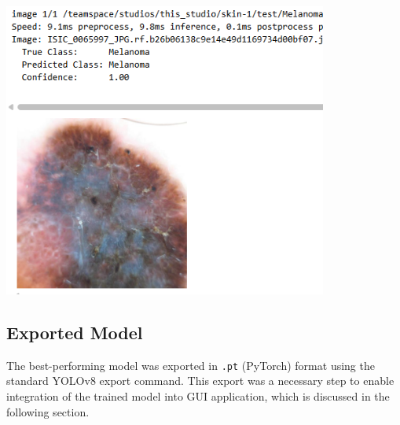 \documentclass[a4paper,12pt]{report}
\begin{document}
\begin{spacing}{1.5}
    \begin{center}
        \includegraphics[width=0.8\textwidth]{Pics/pred2.png}
    \end{center}
    
    
    \subsection{Exported Model}
    
    The best-performing model was exported in \texttt{.pt} (PyTorch) format using the standard YOLOv8 export command. This export was a necessary step to enable integration of the trained model into GUI application, which is discussed in the following section. 
    

    





\end{spacing}
\end{document}
